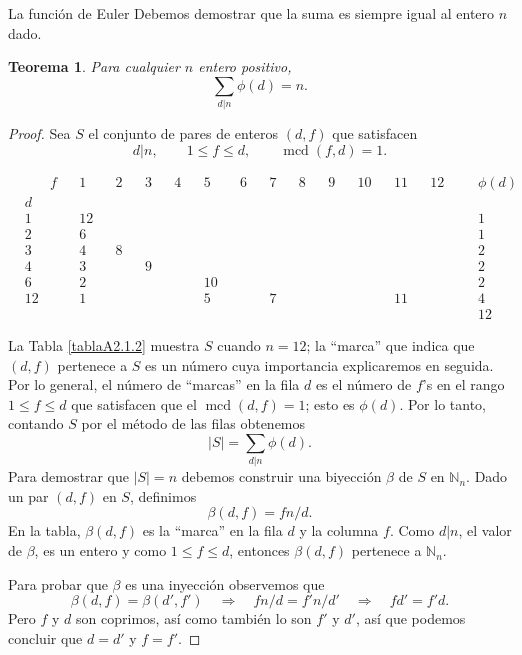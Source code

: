 \documentclass[11pt,spanish,makeidx]{amsbook}
\newtheorem{teorema}{Teorema}[section]
\theoremstyle{definition}
\theoremstyle{remark}
\newcommand \mcd{\operatorname{mcd}}
\begin{document}
\begin{section}{La función de Euler}
Debemos demostrar que la suma es siempre igual al entero $n$ dado.

\begin{teorema}\label{tA2.1b} Para cualquier $n$ entero positivo,
$$
\sum_{d|n} \phi(d)=n.
$$
\end{teorema}
\begin{proof} Sea $S$ el conjunto de pares de enteros $(d,f)$ que
satisfacen
$$
d|n, \qquad 1\le f \le d, \qquad \mcd(f,d)=1.
$$

\begin{table}[h]
\begin{align*}
&  &f &&1  &&2 &&3 &&4 &&5  &&6 &&7 &&8 &&9 &&10 &&11 &&12 && &\phi(d)\\
&d &  &&   &&  &&  &&  &&   &&  &&  &&  &&  &&   &&   &&   && &   \\
&1 &  &&12 &&  &&  &&  &&   &&  &&  &&  &&  &&   &&   &&   && &1  \\
&2 &  &&6  &&  &&  &&  &&   &&  &&  &&  &&  &&   &&   &&   && &1  \\
&3 &  &&4  &&8 &&  &&  &&   &&  &&  &&  &&  &&   &&   &&   && &2  \\
&4 &  &&3  &&  &&9 &&  &&   &&  &&  &&  &&  &&   &&   &&   && &2  \\
&6 &  &&2  &&  &&  &&  &&10 &&  &&  &&  &&  &&   &&   &&   && &2  \\
&12&  &&1  &&  &&  &&  &&5  &&  &&7 &&  &&  &&   &&11 &&   && &4  \\
&  &  &&   &&  &&  &&  &&   &&  &&  &&  &&  &&   &&   &&   && &12
\end{align*}
\caption{} \label{tablaA2.1.2}
\end{table}

La Tabla \ref{tablaA2.1.2} muestra $S$ cuando $n=12$; la ``marca''
que indica que $(d,f)$ pertenece a $S$ es un número cuya
importancia explicaremos en seguida. Por lo general, el número de
``marcas'' en la fila $d$ es el número de $f$'s en el rango $1\le
f\le d$ que satisfacen que el $\mcd(d,f)=1$; esto es $\phi(d)$.
Por lo tanto, contando $S$ por el método de las filas obtenemos
$$
|S| = \sum_{d|n} \phi(d).
$$
Para demostrar que $|S|=n$ debemos construir una biyección $\beta$
de $S$ en $\mathbb N_n$. Dado un par $(d,f)$ en $S$, definimos
$$
\beta(d,f) = f n/d.
$$
En la tabla, $\beta(d,f)$ es la ``marca'' en la fila $d$ y la
columna $f$. Como $d| n$, el valor de $\beta$, es un entero y como
$1\le f\le d$, entonces $\beta(d,f)$ pertenece a $\mathbb N_n$.

Para probar que $\beta$ es una inyección observemos que
$$
\beta(d,f) = \beta(d',f') \quad \Rightarrow \quad fn/d = f'n/d'
\quad \Rightarrow \quad fd'=f'd.
$$
Pero $f$ y $d$ son coprimos, así como también lo son $f'$ y $d'$,
así que podemos concluir que $d=d'$ y $f=f'$.


\end{proof}
\end{section}
\end{document}
